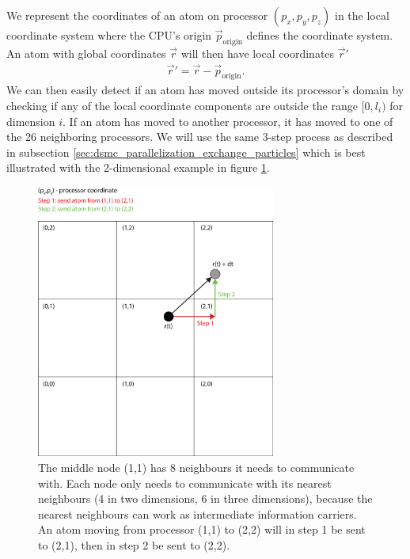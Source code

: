 We represent the coordinates of an atom on processor $(p_x, p_y, p_z)$ in the local coordinate system where the CPU's origin $\vec p_\text{origin}$ defines the coordinate system. An atom with global coordinates $\vec r$ will then have local coordinates $\vec r'$
\begin{align}
	\vec r' = \vec r - \vec p_\text{origin}.
\end{align}
We can then easily detect if an atom has moved outside its processor's domain by checking if any of the local coordinate components are outside the range $[0, l_i)$ for dimension $i$. If an atom has moved to another processor, it has moved to one of the 26 neighboring processors. We will use the same 3-step process as described in subsection \ref{sec:dsmc_parallelization_exchange_particles} which is best illustrated with the 2-dimensional example in figure \ref{fig:md_parallelization_facet_technique}.
\begin{figure}[h!]
\begin{center}
\includegraphics[width=0.7\textwidth, trim=0cm 0cm 0cm 0cm, clip]{MD/figures/parallelization_facet_technique.eps}
\end{center}
\caption{The middle node (1,1) has 8 neighbours it needs to communicate with. Each node only needs to communicate with its nearest neighbours (4 in two dimensions, 6 in three dimensions), because the nearest neighbours can work as intermediate information carriers. An atom moving from processor (1,1) to (2,2) will in step 1 be sent to (2,1), then in step 2 be sent to (2,2).}
\label{fig:md_parallelization_facet_technique}
\end{figure}
